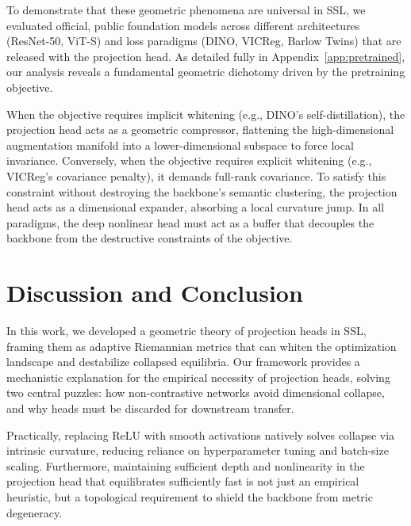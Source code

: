 \documentclass{article}
\theoremstyle{plain}
\theoremstyle{definition}
\theoremstyle{remark}
\begin{document}
To demonstrate that these geometric phenomena are universal in SSL, we evaluated official, public foundation models across different architectures (ResNet-50, ViT-S) and loss paradigms (DINO, VICReg, Barlow Twins) that are released with the projection head. As detailed fully in Appendix~\ref{app:pretrained}, our analysis reveals a fundamental geometric dichotomy driven by the pretraining objective.

When the objective requires implicit whitening (e.g., DINO's self-distillation), the projection head acts as a geometric compressor, flattening the high-dimensional augmentation manifold into a lower-dimensional subspace to force local invariance. Conversely, when the objective requires explicit whitening (e.g., VICReg's covariance penalty), it demands full-rank covariance. To satisfy this constraint without destroying the backbone's semantic clustering, the projection head acts as a dimensional expander, absorbing a local curvature jump. In all paradigms, the deep nonlinear head must act as a buffer that decouples the backbone from the destructive constraints of the objective.

\section{Discussion and Conclusion}
\label{sec:conclusion}

In this work, we developed a geometric theory of projection heads in SSL, framing them as adaptive Riemannian metrics that can whiten the optimization landscape and destabilize collapsed equilibria. Our framework provides a mechanistic explanation for the empirical necessity of projection heads, solving two central puzzles: how non-contrastive networks avoid dimensional collapse, and why heads must be discarded for downstream transfer.

Practically, replacing ReLU with smooth activations natively solves collapse via intrinsic curvature, reducing reliance on hyperparameter tuning and batch-size scaling. Furthermore, maintaining sufficient depth and nonlinearity in the projection head that equilibrates sufficiently fast is not just an empirical heuristic, but a topological requirement to shield the backbone from metric degeneracy.
\end{document}
